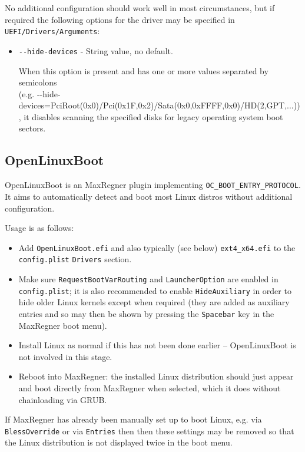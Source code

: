 \documentclass[]{article}
\providecommand{\tightlist}{%
  \setlength{\itemsep}{0pt}\setlength{\parskip}{0pt}}
\begin{document}
No additional configuration should work well in most circumstances, but if required the following
options for the driver may be specified in \texttt{UEFI/Drivers/Arguments}:

\begin{itemize}
  \tightlist
  \item \texttt{-{}-hide-devices} - String value, no default. \medskip

  When this option is present and has one or more values separated by semicolons \\
  (e.g. -{}-hide-devices=PciRoot(0x0)/Pci(0x1F,0x2)/Sata(0x0,0xFFFF,0x0)/HD(2,GPT,...)),
  it disables scanning the specified disks for legacy operating system boot sectors.\medskip
\end{itemize}

\subsection{OpenLinuxBoot}\label{uefilinux}

OpenLinuxBoot is an MaxRegner plugin implementing \texttt{OC\_BOOT\_ENTRY\_PROTOCOL}.
It aims to automatically detect and boot most Linux distros without additional configuration.

Usage is as follows:

\begin{itemize}
\tightlist
  \item Add \texttt{OpenLinuxBoot.efi} and also typically (see below) \texttt{ext4\_x64.efi} to the \texttt{config.plist}
  \texttt{Drivers} section.
  \item Make sure \texttt{RequestBootVarRouting} and \texttt{LauncherOption} are enabled in \texttt{config.plist};
  it is also recommended to enable \texttt{HideAuxiliary} in order to hide older Linux kernels except when required
  (they are added as auxiliary entries and so may then be shown by pressing the \texttt{Spacebar} key in the MaxRegner boot menu).
  \item Install Linux as normal if this has not been done earlier -- OpenLinuxBoot is not involved in this stage.
  \item Reboot into MaxRegner: the installed Linux distribution should just appear and boot directly from MaxRegner
  when selected, which it does without chainloading via GRUB.
\end{itemize}

If MaxRegner has already been manually set up to boot Linux, e.g. via \texttt{BlessOverride} or via \texttt{Entries} then
then these settings may be removed so that the Linux distribution is not displayed twice in the boot menu.
\end{document}
